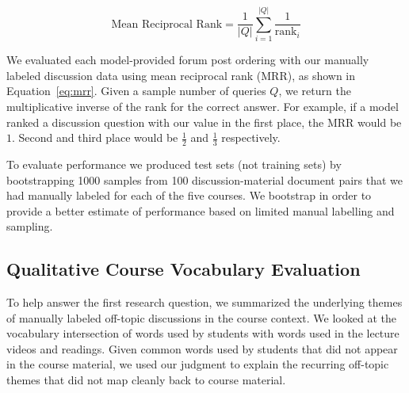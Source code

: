 \documentclass[sigconf, anonymous]{acmart}
\begin{document}
\begin{equation}
    \text{Mean Reciprocal Rank} = \frac{1}{|Q|} \sum^{|Q|}_{i=1}\frac{1}{\text{rank}_i}
    \label{eq:mrr}
\end{equation}

We evaluated each model-provided forum post ordering with our manually labeled discussion data using mean reciprocal rank (MRR), as shown in Equation~\ref{eq:mrr}.
Given a sample number of queries $Q$, we return the multiplicative inverse of the rank for the correct answer.
For example, if a model ranked a discussion question with our value in the first place, the MRR would be $1$.
Second and third place would be $\frac{1}{2}$ and $\frac{1}{3}$ respectively.

To evaluate performance we produced test sets (not training sets) by bootstrapping 1000 samples from 100 discussion-material document pairs that we had manually labeled for each of the five courses. 
We bootstrap in order to provide a better estimate of performance based on limited manual labelling and sampling.


\subsection{Qualitative Course Vocabulary Evaluation}
To help answer the first research question, we summarized the underlying themes of manually labeled off-topic discussions in the course context.
We looked at the vocabulary intersection of words used by students with words used in the lecture videos and readings.
Given common words used by students that did not appear in the course material, we used our judgment to explain the recurring off-topic themes that did not map cleanly back to course material.
\end{document}
